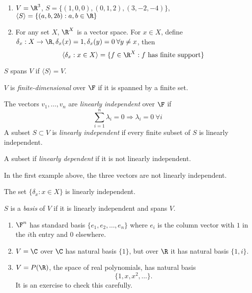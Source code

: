 \documentclass[a4paper]{article}
\theoremstyle{definition}
\begin{document}
\begin{eg}\leavevmode
  \begin{enumerate}
 \item $V=\R^3$, $S = \{(1,0,0),(0,1,2),(3,-2,-4)\}$, $\langle S \rangle = \{(a,b,2b): a,b\in \R \}$
 \item For any set $X$, $\R^X$ is a vector space. For $x \in X$, define $\delta_x: X \to \R, \delta_x(x) = 1, \delta_x(y) = 0 \: \forall y \neq x$, then
   \[
     \langle \delta_x: x\in X \rangle = \{f\in \R^X: f \text{ has finite support} \}
   \]
  \end{enumerate} 
\end{eg}

\begin{defi}
  $S$ spans $V$ if $\langle S \rangle = V$.
\end{defi}

\begin{defi}
  $V$ is \emph{finite-dimensional} over $\F$ if it is spanned by a finite set.
\end{defi}

\begin{defi}
  The vectors $v_1,\ldots, v_n$ are \emph{linearly independent} over $\F$ if
  \[
    \sum_{i=1}^n \lambda_i = 0 \Rightarrow \lambda_i = 0 \: \forall i
  \]
  A subset $S \subset V$ is \emph{linearly independent} if every finite subset of $S$ is linearly independent.

  A subset if \emph{linearly dependent} if it is not linearly independent.
\end{defi}

\begin{eg}
  In the first example above, the three vectors are not linearly independent.
\end{eg}

\begin{ex}
  The set $\{\delta_x: x \in X\}$ is linearly independent.
\end{ex}

\begin{defi}
  $S$ is a \emph{basis} of $V$ if it is linearly independent and spans $V$.
\end{defi}

\begin{eg}\leavevmode
  \begin{enumerate}
  \item $\F^n$ has standard basis $\{e_1,e_2,\ldots,e_n\}$ where $e_i$ is the column vector with $1$ in the $i$th entry and $0$ elsewhere.
  \item $V=\C$ over $\C$ has natural basis $\{1\}$, but over $\R$ it has natural basis $\{1, i\}$.
  \item $V=P(\R)$, the space of real polynomials, has natural basis
    \[
      \{1, x, x^2, \dots \}.
    \]
    It is an exercise to check this carefully.
    \end{enumerate}
\end{eg}
\end{document}
